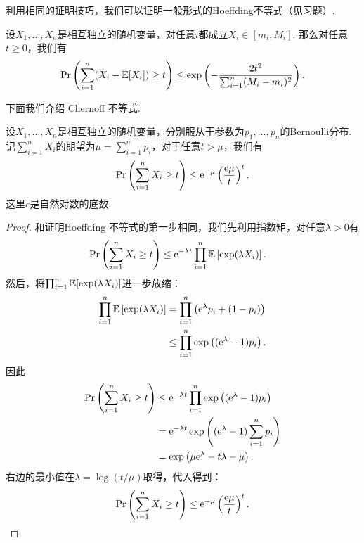 利用相同的证明技巧，我们可以证明一般形式的Hoeffding不等式（见习题）.

\begin{theorem}\label{thm:hoeffding-inequality-general}
    设$X_1, \dots, X_n$是相互独立的随机变量，对任意$i$都成立$X_i \in [m_i, M_i]$. 那么对任意$t\geq0$，我们有
    \[
        \Pr\left(\sum_{i=1}^n (X_i - \mathbb{E} [X_i]) \geq t\right) \leq \exp \left( - \frac{2t^2}{\sum_{i=1}^n (M_i - m_i)^2}\right).
    \]
\end{theorem}

下面我们介绍 Chernoff 不等式. 
\begin{theorem}\label{thm:chernoff-inequality}
    设$X_1, \dots, X_n$是相互独立的随机变量，分别服从于参数为$p_1, \dots, p_n$的Bernoulli分布.  记$\sum_{i=1}^n X_i$的期望为$\mu = \sum_{i=1}^n p_i$，对于任意$t > \mu$，我们有
    \[
        \Pr\left( \sum_{i=1}^n X_i \geq t\right) \leq \mathrm{e}^{-\mu} \left(\frac{\mathrm{e}\mu}{t}\right)^t.  
    \]
    这里$e$是自然对数的底数.
\end{theorem}

\begin{proof}
和证明Hoeffding 不等式的第一步相同，我们先利用指数矩，对任意$\lambda > 0$有
    \[
    \begin{aligned}
        \Pr\left( \sum_{i=1}^n X_i \geq t\right) &\leq \mathrm{e}^{-\lambda t}\prod_{i=1}^n \mathbb{E}\left[\exp (\lambda X_i)\right].
    \end{aligned}
    \]
然后，将$\prod_{i=1}^n\mathbb{E}[\exp (\lambda X_i)]$进一步放缩：
    \[
    \begin{aligned}
        \prod_{i=1}^n \mathbb{E} \left[\exp (\lambda X_i)\right]&= \prod_{i=1}^n \left(\mathrm{e}^\lambda p_i + (1 - p_i) \right) \\
         &\leq \prod_{i=1}^n \exp\left((\mathrm{e}^\lambda -1)p_i \right). \\
    \end{aligned}
    \]
因此
    \[
    \begin{aligned}
        \Pr\left( \sum_{i=1}^n X_i \geq t\right) &\leq \mathrm{e}^{-\lambda t}\prod_{i=1}^n \exp\left((\mathrm{e}^\lambda -1)p_i \right) \\
        &= \mathrm{e}^{-\lambda t} \exp\left((\mathrm{e}^\lambda -1)\sum_{i=1}^n p_i \right)\\
        &=\exp\left(\mu \mathrm{e}^\lambda -t\lambda-\mu \right).
    \end{aligned}
    \]
右边的最小值在$\lambda = \log (t/\mu)$取得，代入得到：
    \[
    \begin{aligned}
        \Pr\left( \sum_{i=1}^n X_i \geq t\right) \leq \mathrm{e}^{-\mu} \left(\frac{\mathrm{e}\mu}{t}\right)^t.
    \end{aligned}
    \]
\end{proof}

